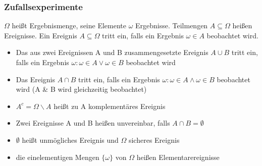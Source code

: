 \documentclass[
	ngerman,
	accentcolor=9c,%
	type=intern,
	marginpar=false
	]{tudapub}
\begin{document}
            \subsubsection{Zufallsexperimente}
                \begin{definition}
                    $\Omega$ heißt Ergebnismenge, seine Elemente $\omega$ Ergebnisse. Teilmengen $A \subseteq \Omega$ heißen Ereignisse.
                    Ein Ereignis $A \subseteq \Omega$ tritt ein, falls ein Ergebnis $\omega \in A$ beobachtet wird.
                \end{definition}
                \setcounter{satz}{2}
                \begin{definition}
                    \begin{itemize}
                        \item Das aus zwei Ereignissen A und B zusammengesetzte Ereignis $A\cup B$ tritt ein, falls ein Ergebnis
                        $\omega: \omega \in A \vee \omega \in B$ beobachtet wird
                        \item Das Ereignis $A \cap B$ tritt ein, falls ein Ergebnis
                        $\omega: \omega \in A \wedge \omega \in B$ beobachtet wird  (A \& B wird gleichzeitig beobachtet)
                        \item $A^c = \Omega \backslash A$ heißt zu A komplementäres Ereignis
                        \item Zwei Ereignisse A und B heißen unvereinbar, falls $A\cap B = \emptyset$
                        \item $\emptyset$ heißt unmögliches Ereignis und $\Omega$ sicheres Ereignis
                        \item die einelementigen Mengen $\{\omega\}$ von $\Omega$ heißen Elementarereignisse
                    \end{itemize}
                \end{definition}
\end{document}
